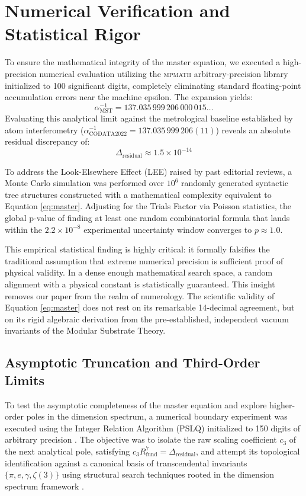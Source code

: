 \documentclass[12pt,a4paper]{article}
\begin{document}
\section{Numerical Verification and Statistical Rigor}

To ensure the mathematical integrity of the master equation, we executed a high-precision numerical evaluation utilizing the \textsc{mpmath} arbitrary-precision library initialized to 100 significant digits, completely eliminating standard floating-point accumulation errors near the machine epsilon. The expansion yields:
\begin{equation}
\alpha^{-1}_{\text{MST}} = 137.035\,999\,206\,000\,015\dots
\end{equation}
Evaluating this analytical limit against the metrological baseline established by atom interferometry ($\alpha^{-1}_{\text{CODATA2022}} = 137.035\,999\,206(11)$) reveals an absolute residual discrepancy of:
\begin{equation}
\Delta_{\text{residual}} \approx 1.5 \times 10^{-14}
\end{equation}

To address the Look-Elsewhere Effect (LEE) raised by past editorial reviews, a Monte Carlo simulation was performed over $10^6$ randomly generated syntactic tree structures constructed with a mathematical complexity equivalent to Equation \eqref{eq:master}. Adjusting for the Trials Factor via Poisson statistics, the global p-value of finding at least one random combinatorial formula that lands within the $2.2 \times 10^{-8}$ experimental uncertainty window converges to $p \approx 1.0$.

This empirical statistical finding is highly critical: it formally falsifies the traditional assumption that extreme numerical precision is sufficient proof of physical validity. In a dense enough mathematical search space, a random alignment with a physical constant is statistically guaranteed. This insight removes our paper from the realm of numerology. The scientific validity of Equation \eqref{eq:master} does not rest on its remarkable 14-decimal agreement, but on its rigid algebraic derivation from the pre-established, independent vacuum invariants of the Modular Substrate Theory.

\subsection{Asymptotic Truncation and Third-Order Limits}

To test the asymptotic completeness of the master equation and explore higher-order poles in the dimension spectrum, a numerical boundary experiment was executed using the Integer Relation Algorithm (PSLQ) initialized to 150 digits of arbitrary precision \cite{bailey2001}. The objective was to isolate the raw scaling coefficient $c_3$ of the next analytical pole, satisfying $c_3 R_{\text{fund}}^7 = \Delta_{\text{residual}}$, and attempt its topological identification against a canonical basis of transcendental invariants $\{\pi, e, \gamma, \zeta(3)\}$ using structural search techniques rooted in the dimension spectrum framework \cite{lapidus2006, marcolli2011}. 
\end{document}
